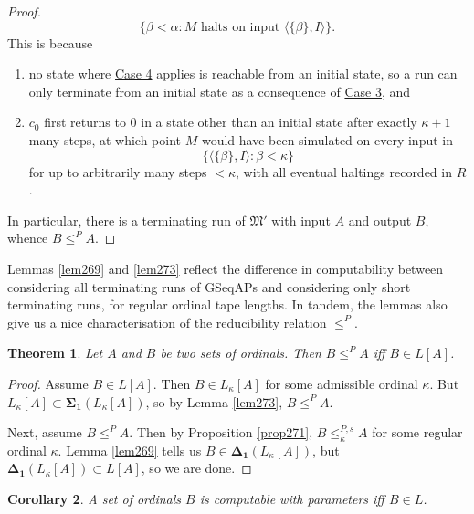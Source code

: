 \documentclass[12pt, twoside]{memoir}
\numberwithin{equation}{section}
\newtheorem{thm}{Theorem}[section]
\newtheorem{cor}[thm]{Corollary}
\theoremstyle{definition}
\theoremstyle{remark}
\theoremstyle{definition}
\theoremstyle{definition}
\theoremstyle{definition}
\theoremstyle{remark}
\begin{document}
\begin{proof}
\begin{equation*}
    \{\beta < \alpha : M \text{ halts on input } \langle \{\beta\}, I \rangle\} \text{.}
\end{equation*}This is because
\begin{enumerate}[label=(\arabic*)]
    \item no state where \hyperref[8340c4]{Case 4} applies is reachable from an initial state, so a run can only terminate from an initial state as a consequence of \hyperref[8340c3]{Case 3}, and
    \item $c_0$ first returns to $0$ in a state other than an initial state after exactly $\kappa + 1$ many steps, at which point $M$ would have been simulated on every input in 
    \begin{equation*}
        \{\langle \{\beta\}, I \rangle : \beta < \kappa\}
    \end{equation*}
    for up to arbitrarily many steps $< \kappa$, with all eventual haltings recorded in $R$.
\end{enumerate}
In particular, there is a terminating run of $\mathfrak{M}'$ with input $A$ and output $B$, whence $B \leq^P A$.
\end{proof}

Lemmas \ref{lem269} and \ref{lem273} reflect the difference in computability between considering all terminating runs of GSeqAPs and considering only short terminating runs, for regular ordinal tape lengths. In tandem, the lemmas also give us a nice characterisation of the reducibility relation $\leq^P$.

\begin{thm}\label{thm275}
Let $A$ and $B$ be two sets of ordinals. Then $B \leq^P A$ iff $B \in L[A]$.
\end{thm}

\begin{proof}
Assume $B \in L[A]$. Then $B \in L_{\kappa}[A]$ for some admissible ordinal $\kappa$. But $L_{\kappa}[A] \subset \mathbf{\Sigma_1}(L_{\kappa}[A])$, so by Lemma \ref{lem273}, $B \leq^P A$. 

Next, assume $B \leq^P A$. Then by Proposition \ref{prop271}, $B \leq^{P, s}_{\kappa} A$ for some regular ordinal $\kappa$. Lemma \ref{lem269} tells us $B \in \mathbf{\Delta_1}(L_{\kappa}[A])$, but $\mathbf{\Delta_1}(L_{\kappa}[A]) \subset L[A]$, so we are done.
\end{proof}

\begin{cor}
A set of ordinals $B$ is computable with parameters iff $B \in L$.
\end{cor}
\end{document}
